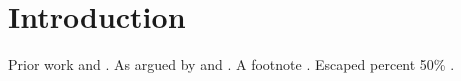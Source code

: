 \section{Introduction}
Prior work \citep[see][p.~3]{alpha2020, beta:2021-x} and \citet{gamma_et.al/2019}.
As argued by \textcite{Delta2018} and \parencite{epsilon2022}.
A footnote \autocite[ch.~2]{zeta2017}. Escaped percent 50\% \cite{alpha2020}.
